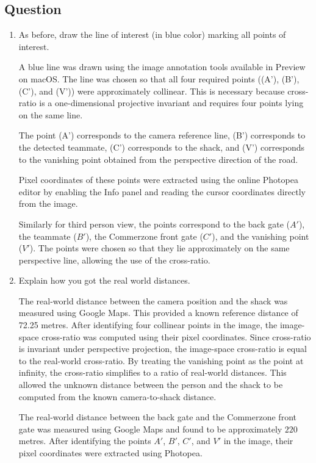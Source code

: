 \subsection{Question}
\begin{enumerate}

\item As before, draw the line of interest (in blue color) marking all points of interest. 
 \begin{studentSpace}
    A blue line was drawn using the image annotation tools available in Preview on macOS. The line was chosen so that all four required points ((A'), (B'), (C'), and (V')) were approximately collinear. This is necessary because cross-ratio is a one-dimensional projective invariant and requires four points lying on the same line.

The point (A') corresponds to the camera reference line, (B') corresponds to the detected teammate, (C') corresponds to the shack, and (V') corresponds to the vanishing point obtained from the perspective direction of the road.

Pixel coordinates of these points were extracted using the online Photopea editor by enabling the Info panel and reading the cursor coordinates directly from the image.

Similarly for third person view, the points correspond to the back gate (\(A'\)), the teammate (\(B'\)), the Commerzone front gate (\(C'\)), and the vanishing point (\(V'\)). The points were chosen so that they lie approximately on the same perspective line, allowing the use of the cross-ratio.
\end{studentSpace}
  
\item Explain how you got the real world distances.
\begin{studentSpace}
    The real-world distance between the camera position and the shack was measured using Google Maps. This provided a known reference distance of 72.25 metres. After identifying four collinear points in the image, the image-space cross-ratio was computed using their pixel coordinates.
Since cross-ratio is invariant under perspective projection, the image-space cross-ratio is equal to the real-world cross-ratio. By treating the vanishing point as the point at infinity, the cross-ratio simplifies to a ratio of real-world distances. This allowed the unknown distance between the person and the shack to be computed from the known camera-to-shack distance.

The real-world distance between the back gate and the Commerzone front gate was measured using Google Maps and found to be approximately \(220\) metres. After identifying the points \(A'\), \(B'\), \(C'\), and \(V'\) in the image, their pixel coordinates were extracted using Photopea.
\end{studentSpace}


\end{enumerate}
